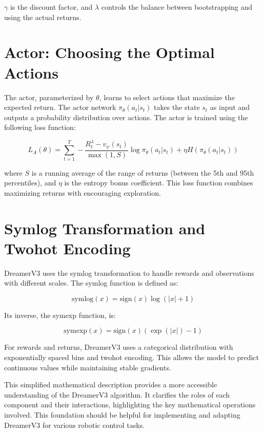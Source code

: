$\gamma$ is the discount factor, and $\lambda$ controls the balance between bootstrapping and using the actual returns.

\section{Actor: Choosing the Optimal Actions}

The actor, parameterized by $\theta$, learns to select actions that maximize the expected return. The actor network $\pi_\theta(a_t | s_t)$ takes the state $s_t$ as input and outputs a probability distribution over actions. The actor is trained using the following loss function:

\begin{equation}
L_A(\theta) = \sum_{t=1}^T - \frac{R_t^\lambda - v_\psi(s_t)}{\max(1, S)} \log \pi_\theta(a_t | s_t) + \eta H(\pi_\theta(a_t | s_t))
\end{equation}

where $S$ is a running average of the range of returns (between the 5th and 95th percentiles), and $\eta$ is the entropy bonus coefficient.  This loss function combines maximizing returns with encouraging exploration.

\section{Symlog Transformation and Twohot Encoding}

DreamerV3 uses the symlog transformation to handle rewards and observations with different scales. The symlog function is defined as:

\begin{equation}
\text{symlog}(x) = \text{sign}(x) \log(|x| + 1)
\end{equation}

Its inverse, the symexp function, is:

\begin{equation}
\text{symexp}(x) = \text{sign}(x) (\exp(|x|) - 1)
\end{equation}

For rewards and returns, DreamerV3 uses a categorical distribution with exponentially spaced bins and twohot encoding.  This allows the model to predict continuous values while maintaining stable gradients.

This simplified mathematical description provides a more accessible understanding of the DreamerV3 algorithm.  It clarifies the roles of each component and their interactions, highlighting the key mathematical operations involved.  This foundation should be helpful for implementing and adapting DreamerV3 for various robotic control tasks.
